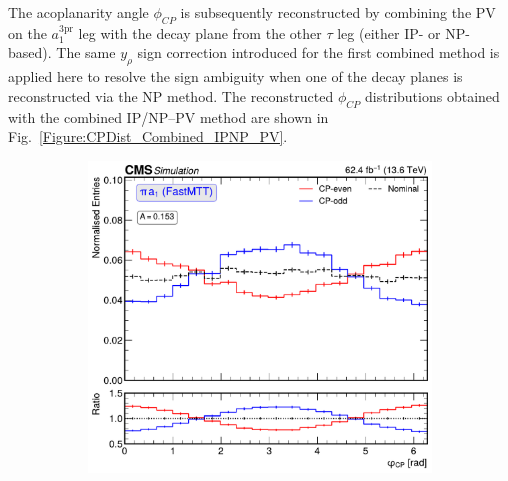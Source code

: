 The acoplanarity angle $\phi_{CP}$ is subsequently reconstructed by combining the \ac{PV} on the $a_1^{3\text{pr}}$ leg with the decay plane from the other $\tau$ leg (either \ac{IP}- or \ac{NP}-based). The same $y_\rho$ sign correction introduced for the first combined method is applied here to resolve the sign ambiguity when one of the decay planes is reconstructed via the \ac{NP} method. The reconstructed $\phi_{CP}$ distributions obtained with the combined \ac{IP}/\ac{NP}--\ac{PV} method are shown in Fig.~\ref{Figure:CPDist_Combined_IPNP_PV}.

\begin{figure}[!htbp]
        \centering
        \begin{subfigure}[b]{0.49\textwidth}
            \centering
            \includegraphics[width=\textwidth]{Figures/Chapter7/Acoplanarity/With_IP/aco_pi_a1_FASTMTT_MassConstraint.pdf}
            \caption{}
        \end{subfigure}
        \begin{subfigure}[b]{0.49\textwidth}
            \centering

\end{subfigure}
\end{figure}
